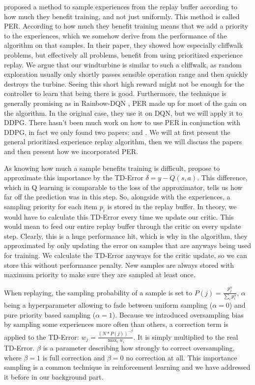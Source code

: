 \documentclass[hyperref,beleg]{cgvpub}
\begin{document}
\cite{schaulPrioritizedExperienceReplay2016} proposed a method to sample experiences from the replay buffer according to how much they benefit training, and not just uniformly. This method is called \ac{PER}. According to how much they benefit training means that we add a priority to the experiences, which we somehow derive from the performance of the algorithm on that samples. In their paper, they showed how especially cliffwalk problems, but effectively all problems, benefit from using prioritized experience replay. We argue that our windturbine is similar to such a cliffwalk, as random exploration usually only shortly passes sensible operation range and then quickly destroys the turbine. Seeing this short high reward might not be enough for the controller to learn that being there is good. Furthermore, the technique is generally promising as in Rainbow-\ac{DQN} \cite{hesselRainbowCombiningImprovements2017}, \ac{PER} made up for most of the gain on the algorithm. In the original case, they use it on \ac{DQN}, but we will apply it to \ac{DDPG}. There hasn't been much work on how to use \ac{PER} in conjunction with \ac{DDPG}, in fact we only found two papers: \cite{houImprovingDDPGPrioritized} and \cite{zhaExperienceReplayOptimization2019}. We will at first present the general prioritized experience replay algorithm, then we will discuss the papers and then present how we incorporated \ac{PER}.

As knowing how much a sample benefits training is difficult, \cite{schaulPrioritizedExperienceReplay2016} propose to approximate this importance by the \ac{TD-Error} $\delta = y - Q(s, a)$. This difference, which in Q learning is comparable to the loss of the approximator, tells us how far off the prediction was in this step. So, alongside with the experiences, a sampling priority for each item $p_i$ is stored in the replay buffer. In theory, we would have to calculate this \ac{TD-Error} every time we update our critic. This would mean to feed our entire replay buffer through the critic on every update step. Clearly, this is a huge performance hit, which is why in the algorithm, they approximated by only updating the error on samples that are anyways being used for training. We calculate the \ac{TD-Error} anyways for the critic update, so we can store this without performance penalty. New samples are always stored with maximum priority to make sure they are sampled at least once.

When replaying, the sampling probability of a sample is set to $P(j) = \frac{p_j^{\alpha}}{\sum_i{p_i^{\alpha}}}$, $\alpha$ being a hyperparameter allowing to fade between uniform sampling ($\alpha=0$) and pure priority based sampling ($\alpha=1$). Because we introduced oversampling bias by sampling some experiences more often than others, a correction term is applied to the \ac{TD-Error}: $w_j = \frac{(N*P(j))^{-\beta}}{\max_i{w_i}}$. It is simply multiplied to the real \ac{TD-Error}. $\beta$ is a parameter describing how strongly to correct oversampling, where $\beta=1$ is full correction and $\beta=0$ no correction at all. This importance sampling is a common technique in reinforcement learning and we have addressed it before in our background part.
\end{document}
